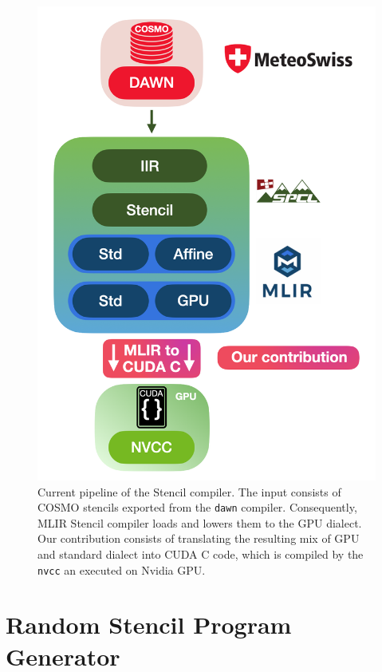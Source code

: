 \documentclass[sigplan,\review anonymous]{acmart}
\begin{document}
\begin{figure}
  \centering
  \includegraphics[width=0.9\columnwidth]{images/lowering_pipeline.png}
  \caption{Current pipeline of the Stencil compiler. The input
  consists of COSMO stencils exported from the \texttt{dawn} compiler.
  Consequently, MLIR Stencil compiler loads and lowers them to the GPU dialect.
  Our contribution consists of translating the resulting mix of GPU and
  standard dialect into CUDA C code, which is compiled by the \texttt{nvcc}
  an executed on Nvidia GPU.}
  \label{fig:pipeline_lowering}
\end{figure}

\section{Random Stencil Program Generator \label{sec:Chapter3}}
\end{document}
